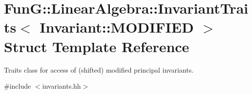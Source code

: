 \hypertarget{structFunG_1_1LinearAlgebra_1_1InvariantTraits_3_01Invariant_1_1MODIFIED_01_4}{\section{Fun\-G\-:\-:Linear\-Algebra\-:\-:Invariant\-Traits$<$ Invariant\-:\-:M\-O\-D\-I\-F\-I\-E\-D $>$ Struct Template Reference}
\label{structFunG_1_1LinearAlgebra_1_1InvariantTraits_3_01Invariant_1_1MODIFIED_01_4}
}


Traits class for access of (shifted) modified principal invariants.  




{\ttfamily \#include $<$invariants.\-hh$>$}

